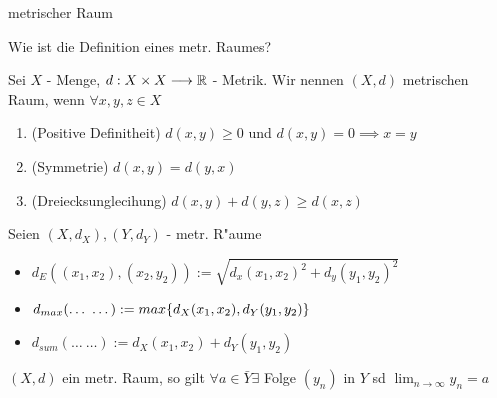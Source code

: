 \documentclass[class=article, crop=false]{standalone}
\begin{document}
\begin{zettel}{metrischer Raum}
\begin{flashcard}[]{}
	\begin{question}
		Wie ist die Definition eines metr. Raumes?
	\end{question}
	\begin{definition}
		Sei $X$ - Menge, $d:X \times X \longrightarrow \mathbb{R}$ - Metrik. Wir nennen $(X,d)$ metrischen Raum, wenn $\forall x,y,z \in X$
		\begin{enumerate}
			\item (Positive Definitheit) $d(x,y) \geq 0$ und $d(x,y)= 0 \implies x = y$
			\item (Symmetrie) $d(x,y) = d(y,x)$
			\item (Dreiecksunglecihung) $d(x,y) + d(y,z) \geq d(x,z)$
		\end{enumerate}
	\end{definition}
\end{flashcard}

\begin{example}[Metriken]
	Seien $ (X,d_X) , (Y,d_Y)  $ - metr. R"aume
	\begin{itemize}
		\item $d_E ( (x_1,x_2) , (x_2,y_2)) := \sqrt{d_x (x_1,x_2)^2 + d_y (y_1,y_2)^2  }$
		\item $d_{max} (\dots\ \dots) := max \set{ d_X (x_1,x_2) , d_Y  (y_1,y_2) }$
		\item $d_{sum} (\dots\ \dots):= d_X (x_1,x_2) +  d_Y (y_1,y_2) $
	\end{itemize}
\end{example}

\begin{theorem}
	$(X,d)$ ein metr. Raum, so gilt $\forall a \in  \bar{Y} \exists $ Folge $(y_n )$ in $Y$ sd $\lim_{n \to \infty} y_n = a$
\end{theorem}

\end{zettel}
\end{document}
